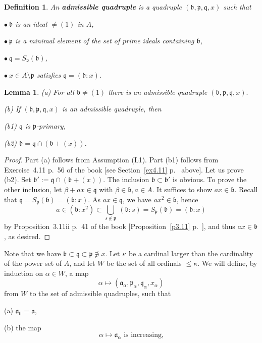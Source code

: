 \documentclass[12pt,letterpaper]{article}%
\newcommand{\mf}{\mathfrak}
\newcommand{\aaa}{\mf a}
\newcommand{\bbb}{\mf b}
\newcommand{\ppp}{\mf p}
\newcommand{\qqq}{\mf q}
\newcommand{\bu}{\bullet}
\newcommand{\nn}{\noindent}
\newtheorem{df}[thm]{Definition}
\newtheorem{lem}[thm]{Lemma}
\begin{document}
\begin{df}\label{admquad} 
An \textbf{admissible quadruple} is a quadruple $(\bbb,\ppp,\qqq,x)$ such that 

\nn$\bu\ \bbb$ is an ideal $\ne(1)$ in $A$, 

\nn$\bu\ \mathfrak p$ is a minimal element of the set of prime ideals containing $\bbb$, 

\nn$\bu\ \mathfrak q=S_{\mathfrak p}(\bbb)$, 

\nn$\bu\ x\in A\setminus\ppp$ satisfies $\mathfrak q=(\bbb:x)$. 
\end{df}

\begin{lem}\label{l417}
\emph{(a)} For all $\bbb\ne(1)$ there is an admissible quadruple 
$
(\bbb,\ppp,\qqq,x).
$

\nn\emph{(b)} If $(\bbb,\ppp,\qqq,x)$ is an admissible quadruple, then 

\emph{(b1)} $\mathfrak q$ is $\mathfrak p$-primary, 

\emph{(b2)} $\bbb=\mathfrak q\cap(\bbb+(x))$.
\end{lem}

\begin{proof} 
Part (a) follows from Assumption (L1). Part (b1) follows from Exercise~4.11 p.~56 of the book [see Section~\ref{ex4.11} p.~\pageref{ex4.11} above]. Let us prove (b2). Set $\bbb':=\mathfrak q\cap(\bbb+(x))$. The inclusion $\bbb\subset\bbb'$ is obvious. To prove the other inclusion, let $\beta+ax\in\qqq$ with $\beta\in\bbb,a\in A$. It suffices to show $ax\in\bbb$. Recall that $\qqq=S_{\ppp}(\bbb)=(\bbb:x)$. As $ax\in\qqq$, we have $ax^2\in\bbb$, hence 
$$
a\in(\bbb:x^2)\subset\bigcup_{s\notin\ppp}\ (\bbb:s)=S_{\ppp}(\bbb)=(\bbb:x)
$$ 
by Proposition~3.11ii p.~41 of the book [Proposition~\ref{p3.11} p.~\pageref{p3.11}], and thus $ax\in\bbb$, as desired. 
\end{proof}

Note that we have $\bbb\subset\qqq\subset\ppp\not\ni x$. Let $\kappa$ be a cardinal larger than the cardinality of the power set of $A$, and let $W$ be the set of all ordinals $\le\kappa$. We will define, by induction on $\alpha\in W$, a map 
\begin{equation}\label{eq417a}
\alpha\mapsto(\aaa_\alpha,\ppp_\alpha,\qqq_\alpha,x_\alpha)
\end{equation}
from $W$ to the set of admissible quadruples, such that 

(a) $\aaa_0=\aaa$, 

(b) the map 
\begin{equation}\label{eq417b}
\alpha\mapsto\aaa_\alpha\text{ is increasing,}
\end{equation} 
\end{document}

